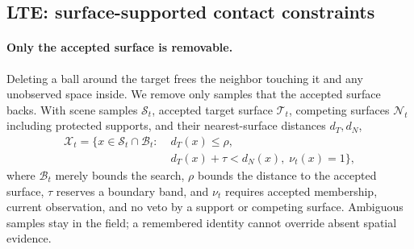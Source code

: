 \subsection{LTE: surface-supported contact constraints}
\label{sec:contact}
\label{sec:exemption}
\paragraph{Only the accepted surface is removable.}
Deleting a ball around the target frees the neighbor touching it and any unobserved space inside. We remove only samples that the accepted surface backs. With scene samples $\mathcal S_t$, accepted target surface $\mathcal T_t$, competing surfaces $\mathcal N_t$ including protected supports, and their nearest-surface distances $d_T,d_N$,
\begin{equation}
\begin{split}
 \mathcal X_t=\big\{x\in\mathcal S_t\cap\mathcal B_t:\;&
 d_T(x)\leq\rho,\\
 &d_T(x)+\tau<d_N(x),\; \nu_t(x)=1\big\},
\end{split}
 \label{eq:region}
\end{equation}
where $\mathcal B_t$ merely bounds the search, $\rho$ bounds the distance to the accepted surface, $\tau$ reserves a boundary band, and $\nu_t$ requires accepted membership, current observation, and no veto by a support or competing surface. Ambiguous samples stay in the field; a remembered identity cannot override absent spatial evidence.

